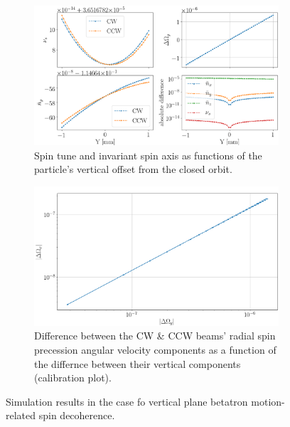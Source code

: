 \begin{figure}[h]
  \centering
  \begin{subfigure}{\linewidth}
    \includegraphics[width=\linewidth]{images/GFF/GFF_stune_range_Y}
    \caption{Spin tune and invariant spin axis as functions of the particle's
      vertical offset from the closed orbit.\label{fig:Y:calib_plot:stune}}
  \end{subfigure}
  \begin{subfigure}{\linewidth}
    \includegraphics[width=\linewidth]{images/GFF/GFF_omegas_range_Y}
    \caption{Difference between the CW \& CCW beams' radial spin precession angular velocity components
      as a function of the differnce between their vertical components
      (calibration plot).\label{fig:Y:calib_plot:omegas}}
  \end{subfigure}    
  \caption{Simulation results in the case fo vertical plane betatron motion-related
    spin decoherence.\label{fig:Y:calib_plot}}
\end{figure}

